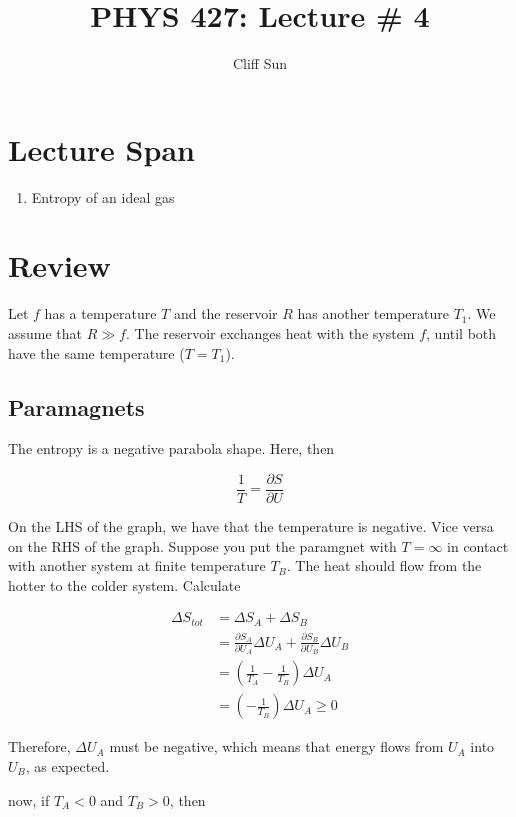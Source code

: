 \documentclass{article}
\title{PHYS 427: Lecture \# 4}
\author{Cliff Sun}
\newtheorem{one minute paper}[theorem]{One Minute Paper}
\begin{document}
\maketitle

\section*{Lecture Span}
\begin{enumerate}
    \item Entropy of an ideal gas
\end{enumerate}

\section*{Review}

Let $f$ has a temperature $T$ and the reservoir $R$ has another temperature $T_1$. We assume that $R \gg f$. The reservoir exchanges heat with the system $f$, until both have the same temperature ($T = T_1$). 

\subsection*{Paramagnets}
The entropy is a negative parabola shape. Here, then 

\begin{equation}
    \frac{1}{T} = \frac{\partial S}{\partial U}
\end{equation}

On the LHS of the graph, we have that the temperature is negative. Vice versa on the RHS of the graph. Suppose you put the paramgnet with $T = \infty$ in contact with another system at finite temperature $T_B$. The heat should flow from the hotter to the colder system. Calculate 

\begin{align}
    \Delta S_{tot} &= \Delta S_{A} + \Delta S_{B}\\
    &= \frac{\partial S_A}{\partial U_A} \Delta U_A + \frac{\partial S_B}{\partial U_B} \Delta U_B \\
    &= \left( \frac{1}{T_A} - \frac{1}{T_B}\right)\Delta U_A \\
    &= \left( -\frac{1}{T_B} \right)\Delta U_A \geq 0
\end{align}

Therefore, $\Delta U_A$ must be negative, which means that energy flows from $U_A$ into $U_B$, as expected. 

now, if $T_A < 0$ and $T_B > 0$, then 
\end{document}
